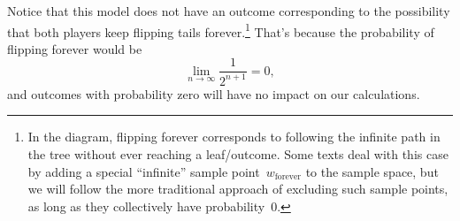 Notice that this model does not have an outcome corresponding to the
possibility that both players keep flipping tails forever.\footnote{In
  the diagram, flipping forever corresponds to following the infinite
  path in the tree without ever reaching a leaf/outcome. Some texts
  deal with this case by adding a special ``infinite'' sample
  point~$w_{\text{forever}}$ to the sample space, but we will follow
  the more traditional approach of excluding such sample points, as
  long as they collectively have probability~0.}  That's because the
probability of flipping forever would be
\begin{equation*}
    \lim_{n \to \infty} \frac{1}{2^{n + 1}} = 0,
\end{equation*}
and outcomes with probability zero will have no impact on our
calculations.

\begin{problems}
\classproblems
{}
\end{problems}

\problemsection

\endinput
